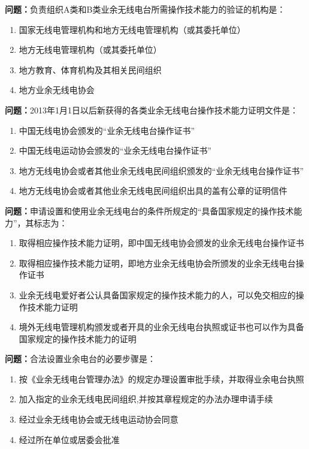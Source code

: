 \textbf{问题：}负责组织A类和B类业余无线电台所需操作技术能力的验证的机构是：
\begin{enumerate}[label=\Alph*), leftmargin=3em]
	\item 国家无线电管理机构和地方无线电管理机构（或其委托单位）
	\item 地方无线电管理机构（或其委托单位）
	\item 地方教育、体育机构及其相关民间组织
	\item 地方业余无线电协会
\end{enumerate}

\textbf{问题：}2013年1月1日以后新获得的各类业余无线电台操作技术能力证明文件是：
\begin{enumerate}[label=\Alph*), leftmargin=3em]
	\item 中国无线电协会颁发的“业余无线电台操作证书”
	\item 中国无线电运动协会颁发的“业余无线电台操作证书”
	\item 地方无线电协会或者其他业余无线电民间组织颁发的“业余无线电台操作证书”
	\item 地方无线电协会或者其他业余无线电民间组织出具的盖有公章的证明信件
\end{enumerate}

\textbf{问题：}申请设置和使用业余无线电台的条件所规定的“具备国家规定的操作技术能力”，其标志为：
\begin{enumerate}[label=\Alph*), leftmargin=3em]
	\item 取得相应操作技术能力证明，即中国无线电协会颁发的业余无线电台操作证书
	\item 取得相应操作技术能力证明，即地方业余无线电协会所颁发的业余无线电台操作证书
	\item 业余无线电爱好者公认具备国家规定的操作技术能力的人，可以免交相应的操作技术能力证明
	\item 境外无线电管理机构颁发或者开具的业余无线电台执照或证书也可以作为具备国家规定的操作技术能力的证明
\end{enumerate}

\textbf{问题：}合法设置业余电台的必要步骤是：
\begin{enumerate}[label=\Alph*), leftmargin=3em]
	\item 按《业余无线电台管理办法》的规定办理设置审批手续，并取得业余电台执照
	\item 加入指定的业余无线电民间组织,并按其章程规定的办法办理申请手续
	\item 经过业余无线电协会或无线电运动协会同意
	\item 经过所在单位或居委会批准
\end{enumerate}

